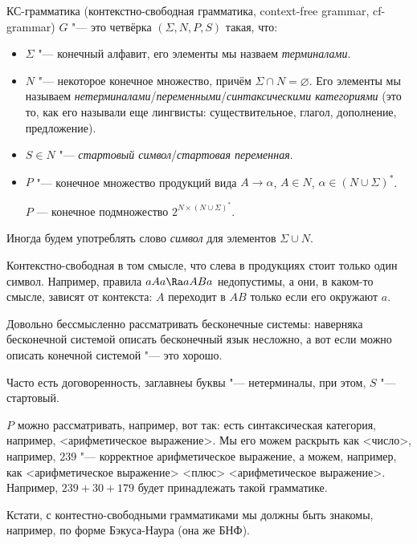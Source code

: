 \begin{Def}
    КС-грамматика (контекстно-свободная грамматика, context-free grammar, cf-grammar)
    $G$ "--- это четвёрка $(\Sigma, N, P, S)$ такая, что:
    \begin{itemize}
        \item
            $\Sigma$ "--- конечный алфавит, его элементы мы назваем \textit{терминалами}.
        \item
            $N$ "--- некоторое конечное множество, причём $\Sigma \cap N = \varnothing$.
            Его элементы мы называем \textit{нетерминалами}/\textit{переменными}/\textit{синтаксическими категориями}
            (это то, как его называли еще лингвисты: существительное, глагол, дополнение, предложение).
        \item
            $S \in N$ "--- \textit{стартовый символ}/\textit{стартовая переменная}.
        \item
            $P$ "--- конечное множество продукций вида $A \to \alpha$, $A \in N$, $\alpha \in (N \cup \Sigma)^*$.
            
            $P$ --- конечное подмножество $2^{N \times (N \cup \Sigma)^*}$.
    \end{itemize}
\end{Def}
\begin{Rem}
    Иногда будем употреблять слово \textit{символ} для элементов $\Sigma \cup N$.
\end{Rem}
\begin{Rem}
Контекстно-свободная в том смысле, что слева в продукциях стоит только один символ. 
Например, правила $aAa \Ra aABa$ недопустимы, а они, в каком-то смысле, зависят от контекста: $A$ переходит в $AB$ только если его окружают $a$.
\end{Rem}
\begin{Rem}
    Довольно бессмысленно рассматривать бесконечные системы: наверняка бесконечной системой
    описать бесконечный язык несложно, а вот если можно описать конечной системой "--- это хорошо.
\end{Rem}
\begin{Rem}
    Часто есть договоренность, заглавнеы буквы "--- нетерминалы, при этом, $S$ "--- стартовый.
\end{Rem}
\begin{Rem}
    $P$ можно рассматривать, например, вот так: есть синтаксическая категория, например, <арифметическое выражение>. 
    Мы его можем раскрыть как <число>, например, $239$ "--- корректное арифметическое выражение, а можем, например, как <арифметическое выражение> <плюс> <арифметическое выражение>. 
    Например, $239 + 30 + 179$ будет принадлежать такой грамматике.
\end{Rem}
\begin{Rem}
   Кстати, с контестно-свободными грамматиками мы должны быть знакомы, например, по форме Бэкуса-Наура (она же БНФ). %
\end{Rem}

